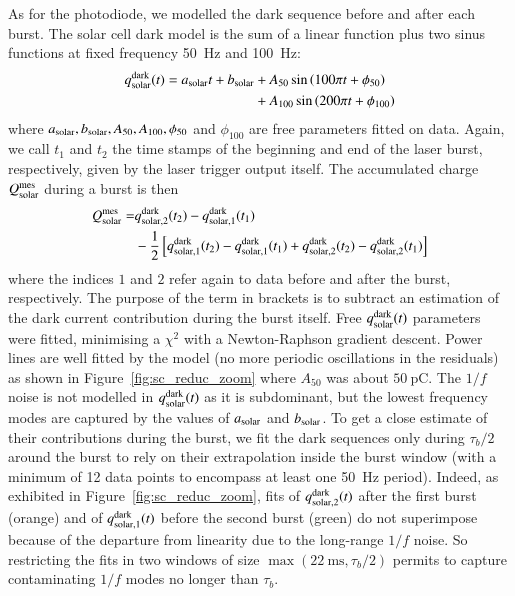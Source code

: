 As for the photodiode, we modelled the dark sequence before and after each burst. The solar cell dark model is the sum of a linear function plus two sinus functions at fixed frequency \SI{50}{\hertz} and \SI{100}{\hertz}:
\begin{align}
    q_{\rm solar}^{\rm dark}(t) = a_{\rm solar}t + b_{\rm solar} & + A_{50} \sin \left( 100 \pi t + \phi_{50}\right)  \notag \\  & +  A_{100} \sin \left( 200 \pi t + \phi_{100}\right)
\end{align}
where $a_{\rm solar}, b_{\rm solar}, A_{50}, A_{100}, \phi_{50}$ and $\phi_{100}$ are free parameters fitted on data. 
Again, we call $t_1$ and $t_2$ the time stamps of the beginning and end of the laser burst, respectively, given by the laser trigger output itself.
The accumulated charge $Q_{\mathrm{solar}}^{\mathrm{mes}}$ during a burst is then
\begin{align}\label{eq:qsolar}
Q_{\mathrm{solar}}^{\mathrm{mes}}  = & q_{\rm solar,2}^{\rm dark}(t_2) - q_{\rm solar, 1}^{\rm dark}(t_1) \\  &  - \frac{1}{2} \left[q_{\rm solar,1}^{\rm dark}(t_2) - q_{\rm solar,1}^{\rm dark}(t_1) + q_{\rm solar,2}^{\rm dark}(t_2) - q_{\rm solar,2}^{\rm dark}(t_1)  \right]    \notag
\end{align}
where the indices $1$ and $2$ refer again to data before and after the burst, respectively. The purpose of the term in brackets is to subtract an estimation of the dark current contribution during the burst itself. Free $q_{\rm solar}^{\rm dark}(t)$ parameters were fitted, minimising a $\chi^2$ with a Newton-Raphson gradient descent. Power lines are well fitted by the model (no more periodic oscillations in the residuals) as shown in Figure~\ref{fig:sc_reduc_zoom} where $A_{50}$ was about $\SI{50}{\pico\coulomb}$.
The $1/f$ noise is not modelled in $q_{\rm solar}^{\rm dark}(t)$ as it is subdominant, but the lowest frequency modes are captured by the values of $a_{\rm solar}$ and $b_{\rm solar}$. To get a close estimate of their contributions during the burst, we fit the dark sequences only during $\tau_b/2$ around the burst to rely on their extrapolation inside the burst window (with a minimum of 12 data points to encompass at least one \SI{50}{\hertz} period). %
Indeed, as exhibited in Figure~\ref{fig:sc_reduc_zoom}, fits of $q_{\rm solar,2}^{\rm dark}(t)$ after the first burst (orange) and of $q_{\rm solar,1}^{\rm dark}(t)$ before the second burst (green) do not superimpose because of the departure from linearity due to the long-range $1/f$ noise. So restricting the fits in two windows of size $\max(\SI{22}{\ms},\tau_b/2)$ permits to capture contaminating $1/f$ modes no longer than $\tau_b$. 

